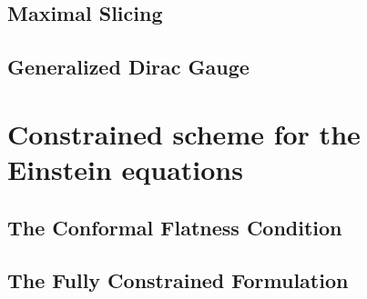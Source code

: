 \subsection{Maximal Slicing} 
\label{section2.4.1}

\subsection{Generalized Dirac Gauge}
\label{section2.4.2}

\section{Constrained scheme for the Einstein equations}  %
\label{section2.5}

\subsection{The Conformal Flatness Condition}  %
\label{section2.5.1}

\subsection{The Fully Constrained Formulation}  %
\label{section2.5.2}

